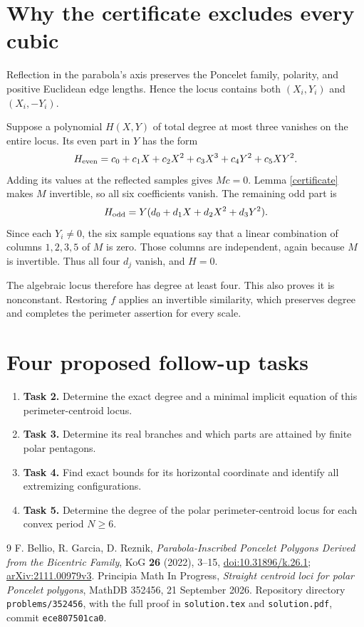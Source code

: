 \documentclass[11pt]{article}
\begin{document}
\section*{Why the certificate excludes every cubic}
Reflection in the parabola's axis preserves the Poncelet family,
polarity, and positive Euclidean edge lengths. Hence the locus
contains both $(X_i,Y_i)$ and $(X_i,-Y_i)$.

Suppose a polynomial $H(X,Y)$ of total degree at most three
vanishes on the entire locus. Its even part in $Y$ has the form
\[
 H_{\rm even}=c_0+c_1X+c_2X^2+c_3X^3+c_4Y^2+c_5XY^2 .
\]
Adding its values at the reflected samples gives $Mc=0$.
Lemma \ref{certificate} makes $M$ invertible, so all six
coefficients vanish. The remaining odd part is
\[
 H_{\rm odd}=Y(d_0+d_1X+d_2X^2+d_3Y^2).
\]
Since each $Y_i\ne0$, the six sample equations say that a linear
combination of columns $1,2,3,5$ of $M$ is zero. Those columns
are independent, again because $M$ is invertible. Thus all four
$d_j$ vanish, and $H=0$.

The algebraic locus therefore has degree at least four.
This also proves it is nonconstant. Restoring $f$ applies an
invertible similarity, which preserves degree and completes the
perimeter assertion for every scale.

\section*{Four proposed follow-up tasks}
\begin{enumerate}
 \item \textbf{Task 2.} Determine the exact degree and a minimal
 implicit equation of this perimeter-centroid locus.
 \item \textbf{Task 3.} Determine its real branches and which
 parts are attained by finite polar pentagons.
 \item \textbf{Task 4.} Find exact bounds for its horizontal
 coordinate and identify all extremizing configurations.
 \item \textbf{Task 5.} Determine the degree of the polar
 perimeter-centroid locus for each convex period $N\geq6$.
\end{enumerate}

\begin{thebibliography}{9}
 F. Bellio, R. Garcia, D. Reznik,
\emph{Parabola-Inscribed Poncelet Polygons Derived from the Bicentric Family},
KoG \textbf{26} (2022), 3--15,
\href{https://doi.org/10.31896/k.26.1}{doi:10.31896/k.26.1};
\href{https://arxiv.org/abs/2111.00979}{arXiv:2111.00979v3}.
 Principia Math In Progress,
\emph{Straight centroid loci for polar Poncelet polygons},
MathDB 352456, 21 September 2026.
Repository directory \texttt{problems/352456}, with the full proof
in \texttt{solution.tex} and \texttt{solution.pdf},
commit \texttt{ece807501ca0}.
\end{thebibliography}
\end{document}
